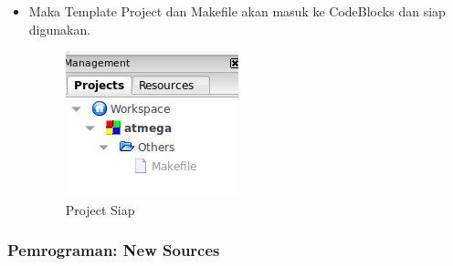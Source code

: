 \documentclass[12pt,]{article}
\begin{document}
\begin{itemize}
		\newpage
		\item Maka Template Project dan Makefile akan masuk ke CodeBlocks dan siap digunakan.
		
		\begin{figure}[H]
			\centering
			\includegraphics[width=0.5\linewidth]{images/cbp_2}
			\caption{Project Siap}
		\end{figure}
		
	\end{itemize}

	\newpage
	\subsubsection{Pemrograman: New Sources}
	
\end{document}
